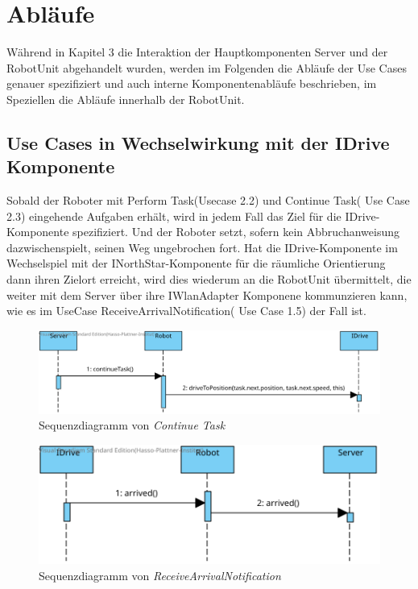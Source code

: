 \section{Abläufe}

Während in Kapitel 3 die Interaktion der Hauptkomponenten Server und der RobotUnit abgehandelt wurden, werden im Folgenden die Abläufe der Use Cases genauer spezifiziert und auch interne Komponentenabläufe beschrieben, im Speziellen die Abläufe innerhalb der RobotUnit.

\subsection*{Use Cases in Wechselwirkung mit der IDrive Komponente }
Sobald der Roboter mit Perform Task(Usecase 2.2)  und Continue Task( Use Case  2.3) eingehende Aufgaben erhält, wird in jedem Fall das Ziel für die IDrive-Komponente spezifiziert. 
Und der Roboter setzt, sofern kein Abbruchanweisung dazwischenspielt, seinen Weg ungebrochen fort. Hat die IDrive-Komponente im Wechselspiel mit der INorthStar-Komponente für die räumliche Orientierung dann ihren Zielort erreicht, wird dies wiederum an die RobotUnit übermittelt, die weiter mit dem Server über ihre IWlanAdapter Komponene kommunzieren kann, wie es im UseCase ReceiveArrivalNotification( Use Case 1.5) der Fall ist.
\\

		\begin{figure}[H]
		\centering
		\includegraphics[width=1\textwidth]{img/2-Entwurf-ContinueTask.svg}
		\caption{Sequenzdiagramm von \emph{Continue Task}}
		\label{ReadSensors}
	\end{figure}
	
	\begin{figure}[H]
		\centering
		\includegraphics[width=1\textwidth]{img/2-Entwurf-ReceiveArrivalNotification.svg}
		\caption{Sequenzdiagramm von \emph{ReceiveArrivalNotification}}
		\label{ReadSensors}
	\end{figure}

